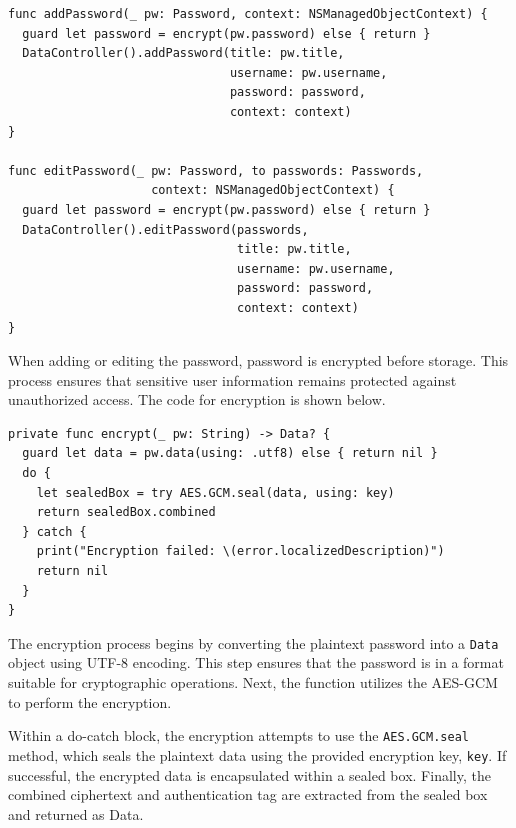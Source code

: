 \documentclass[10pt, titlepage]{article}
\begin{document}
\begin{center}
\begin{minipage}{\linewidth}
\begin{lstlisting}
func addPassword(_ pw: Password, context: NSManagedObjectContext) {
  guard let password = encrypt(pw.password) else { return }
  DataController().addPassword(title: pw.title, 
                               username: pw.username,
                               password: password,
                               context: context)
}

func editPassword(_ pw: Password, to passwords: Passwords, 
                    context: NSManagedObjectContext) {
  guard let password = encrypt(pw.password) else { return }
  DataController().editPassword(passwords, 
                                title: pw.title,
                                username: pw.username,
                                password: password,
                                context: context)
}
\end{lstlisting}
\end{minipage}
\end{center}
When adding or editing the password, password is encrypted before storage. This process ensures that sensitive user information remains protected against unauthorized access. The code for encryption is shown below. 
\begin{center}
\begin{minipage}{\linewidth}
\begin{lstlisting}
private func encrypt(_ pw: String) -> Data? {
  guard let data = pw.data(using: .utf8) else { return nil }
  do {
    let sealedBox = try AES.GCM.seal(data, using: key)
    return sealedBox.combined
  } catch {
    print("Encryption failed: \(error.localizedDescription)")
    return nil
  }
}
\end{lstlisting}
\end{minipage}
\end{center}
The encryption process begins by converting the plaintext password into a \texttt{Data} object using UTF-8 encoding. This step ensures that the password is in a format suitable for cryptographic operations. Next, the function utilizes the AES-GCM to perform the encryption. 

Within a do-catch block, the encryption attempts to use the \texttt{AES.GCM.seal} method, which seals the plaintext data using the provided encryption key, \texttt{key}. If successful, the encrypted data is encapsulated within a sealed box. Finally, the combined ciphertext and authentication tag are extracted from the sealed box and returned as Data.
\end{document}
